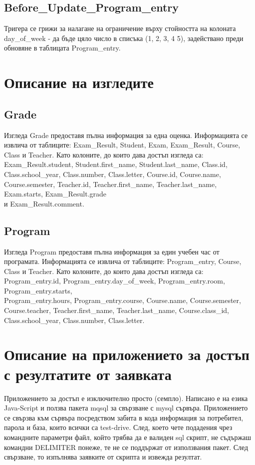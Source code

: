\documentclass[a4paper, 12pt, x11names]{article}
\begin{document}
\subsection{Before\_Update\_Program\_entry}
Тригера се грижи за налагане на ограничение върху
стойността на колоната day\_of\_week - да бъде цяло число в списъка (1, 2, 3, 4 5),
задействано преди обновяне в таблицата Program\_entry.
\section{Описание на изгледите}
\subsection{Grade}
Изгледа Grade предоставя пълна информация за една оценка.
Информацията се извлича от таблиците: Exam\_Result,
Student, Exam, Exam\_Result, Course, Class и Teacher.
Като колоните, до които дава достъп изгледа са:
Exam\_Result.student, Student.first\_name,
Student.last\_name, Class.id, Class.school\_year,
Class.number, Class.letter, Course.id, Course.name,
Course.semester, Teacher.id, Teacher.first\_name,
Teacher.last\_name, Exam.starts, Exam\_Result.grade \\
и Exam\_Result.comment.
\subsection{Program}
Изгледа Program предоставя пълна информация за един учебен час от програмата.
Информацията се извлича от таблиците: Program\_entry,
Course, Class и Teacher.
Като колоните, до които дава достъп изгледа са:
Program\_entry.id,
Program\_entry.day\_of\_week,
Program\_entry.room,
Program\_entry.starts, \\
Program\_entry.hours,
Program\_entry.course,
Course.name,
Course.semester,
Course.teacher,
Teacher.first\_name,
Teacher.last\_name,
Course.class\_id,
Class.school\_year,
Class.number,
Class.letter.
\section{Описание на приложението за достъп с резултатите от заявката}
Приложението за достъп е изключително просто (семпло).
Написано е на езика Java-Script и ползва пакета mqsql за свързване с mysql сървъра.
Приложението се свързва към сървъра посредством забита в кода информация
за потребител, парола и база, които всички са test-drive.
След, което чете подадения чрез командните параметри файл, който трябва да е валиден sql
скрипт, не съдържаш командни DELIMITER понеже, те не се поддържат от използвания пакет.
След свързване, то изпълнява заявките от скрипта и извежда резултат.
\end{document}
